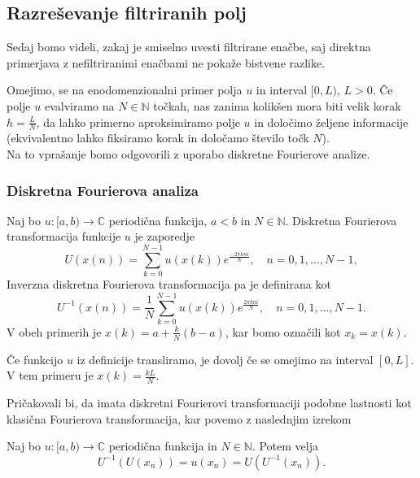 \documentclass[mat2, tisk]{fmfdelo}
\newcommand{\N}{\mathbb N}
\newcommand{\C}{\mathbb C}
\begin{document}
\subsection{Razreševanje filtriranih polj}

Sedaj bomo videli, zakaj je smiselno uvesti filtrirane enačbe, saj 
direktna primerjava z nefiltriranimi enačbami ne pokaže bistvene razlike.

Omejimo, se na enodomenzionalni primer polja $u$ in interval $[0, L)$, 
$L > 0$. Če polje $u$ evalviramo na $N \in \N$ točkah, nas zanima 
kolikšen mora biti velik korak $h = \frac{L}{N}$, da lahko primerno aproksimiramo 
polje $u$ in določimo željene informacije (ekvivalentno lahko fiksiramo 
korak in določamo število točk $N$). \\
Na to vprašanje bomo odgovorili z uporabo diskretne Fourierove analize. 

\subsubsection{Diskretna Fourierova analiza}

\begin{definicija}
Naj bo $u: [a, b) \rightarrow \C$ periodična funkcija, $a < b$ in $N\in \N$. 
Diskretna Fourierova transformacija funkcije $u$ je zaporedje 
\begin{equation}
U(x(n)) = \sum_{k=0}^{N-1} u(x(k)) e^{\frac{-2\pi k n i}{N}}, \quad n = 0, 1, \dots, N-1,
\end{equation}
Inverzna diskretna Fourierova transformacija pa je definirana kot 
\begin{equation}
  U^{-1}(x(n)) = \frac{1}{N}\sum_{k=0}^{N-1} u(x(k)) e^{\frac{2\pi k n i}{N}}, \quad n = 0, 1, \dots, N-1.
\end{equation}
V obeh primerih je $x(k) = a + \frac{k}{N}(b-a)$, kar bomo označili kot
$x_k = x(k)$.
\end{definicija}

\begin{opomba}
Če funkcijo $u$ iz definicije transliramo, je dovolj če se 
omejimo na interval $[0, L]$. V tem primeru je $x(k) = \frac{kL}{N}$.
\end{opomba}

Pričakovali bi, da imata diskretni Fourierovi transformaciji podobne 
lastnosti kot klasična Fourierova transformacija, kar povemo z 
naslednjim izrekom 

\begin{izrek}
\label{izrek:iDFT}
Naj bo $u: [a, b) \rightarrow \C$ periodična funkcija in $N\in \N$. Potem velja
\begin{equation}
U^{-1}(U(x_n)) = u(x_n) = U(U^{-1}(x_n)).
\end{equation}
\end{izrek}
\end{document}
